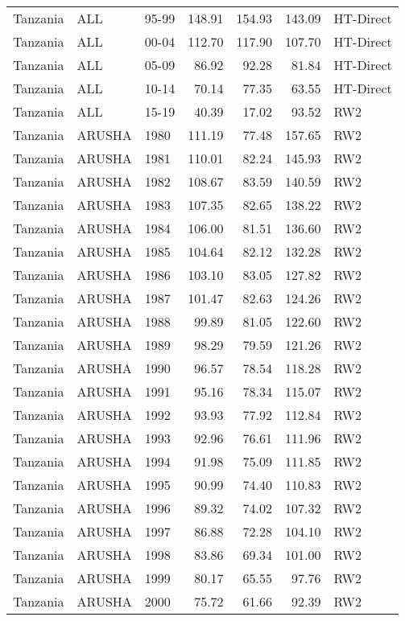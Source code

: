 \begin{longtable}{lllrrrl}
  Tanzania & ALL & 95-99 & 148.91 & 154.93 & 143.09 & HT-Direct \\ 
  Tanzania & ALL & 00-04 & 112.70 & 117.90 & 107.70 & HT-Direct \\ 
  Tanzania & ALL & 05-09 & 86.92 & 92.28 & 81.84 & HT-Direct \\ 
  Tanzania & ALL & 10-14 & 70.14 & 77.35 & 63.55 & HT-Direct \\ 
  Tanzania & ALL & 15-19 & 40.39 & 17.02 & 93.52 & RW2 \\ 
  Tanzania & ARUSHA & 1980 & 111.19 & 77.48 & 157.65 & RW2 \\ 
  Tanzania & ARUSHA & 1981 & 110.01 & 82.24 & 145.93 & RW2 \\ 
  Tanzania & ARUSHA & 1982 & 108.67 & 83.59 & 140.59 & RW2 \\ 
  Tanzania & ARUSHA & 1983 & 107.35 & 82.65 & 138.22 & RW2 \\ 
  Tanzania & ARUSHA & 1984 & 106.00 & 81.51 & 136.60 & RW2 \\ 
  Tanzania & ARUSHA & 1985 & 104.64 & 82.12 & 132.28 & RW2 \\ 
  Tanzania & ARUSHA & 1986 & 103.10 & 83.05 & 127.82 & RW2 \\ 
  Tanzania & ARUSHA & 1987 & 101.47 & 82.63 & 124.26 & RW2 \\ 
  Tanzania & ARUSHA & 1988 & 99.89 & 81.05 & 122.60 & RW2 \\ 
  Tanzania & ARUSHA & 1989 & 98.29 & 79.59 & 121.26 & RW2 \\ 
  Tanzania & ARUSHA & 1990 & 96.57 & 78.54 & 118.28 & RW2 \\ 
  Tanzania & ARUSHA & 1991 & 95.16 & 78.34 & 115.07 & RW2 \\ 
  Tanzania & ARUSHA & 1992 & 93.93 & 77.92 & 112.84 & RW2 \\ 
  Tanzania & ARUSHA & 1993 & 92.96 & 76.61 & 111.96 & RW2 \\ 
  Tanzania & ARUSHA & 1994 & 91.98 & 75.09 & 111.85 & RW2 \\ 
  Tanzania & ARUSHA & 1995 & 90.99 & 74.40 & 110.83 & RW2 \\ 
  Tanzania & ARUSHA & 1996 & 89.32 & 74.02 & 107.32 & RW2 \\ 
  Tanzania & ARUSHA & 1997 & 86.88 & 72.28 & 104.10 & RW2 \\ 
  Tanzania & ARUSHA & 1998 & 83.86 & 69.34 & 101.00 & RW2 \\ 
  Tanzania & ARUSHA & 1999 & 80.17 & 65.55 & 97.76 & RW2 \\ 
  Tanzania & ARUSHA & 2000 & 75.72 & 61.66 & 92.39 & RW2 \\ 

\end{longtable}
